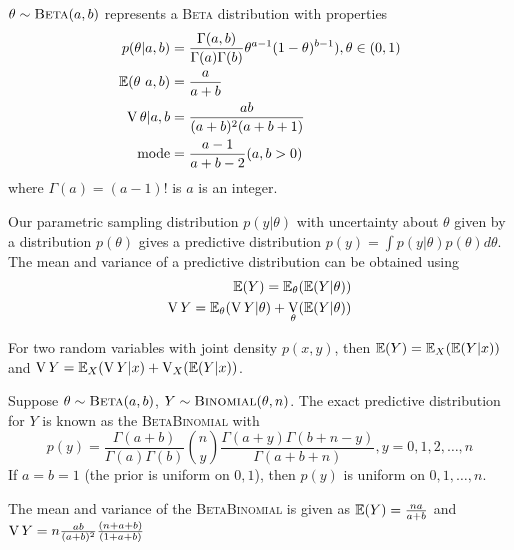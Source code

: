 \begin{defn}
  \label{sec:prob-bayes-theor-4}
  $\theta \sim \textsc{Beta}(a, b)$ represents a \textsc{Beta} distribution with
  properties
  \begin{align}
    p(\theta | a, b) &= \frac{\Gamma(a, b)}{\Gamma(a) \Gamma(b)} \theta^{a-1} (1 - \theta)^{b-1}), \theta \in (0, 1) \\
    \E{\theta \ a, b} &= \frac{a}{a+b} \\
    \V{\theta | a, b} &= \frac{ab}{(a+b)^{2}(a+b+1)} \\
    \text{mode} &= \frac{a-1}{a+b - 2}  (a, b > 0) \\
  \end{align}
  where $\Gamma(a) = (a-1)!$ is $a$ is an integer.
\end{defn}

\begin{thm}
  \label{sec:prob-bayes-theor-5}
  Our parametric sampling distribution $p(y | \theta)$ with
  uncertainty about $\theta$ given by a distribution $p(\theta)$ gives
  a predictive distribution $p(y) = \int p(y| \theta) p(\theta)
  d\theta$.
  The mean and variance of a predictive distribution can be obtained
  using
  \begin{align}
    \label{eq:4}
    \E{Y} = \E_{\theta}(\E{Y | \theta}) \\
    \V{Y} = \E_{\theta}(\V{Y | \theta}) + \V_{\theta}(\E{Y | \theta})
  \end{align}
\end{thm}

\begin{thm}
  \label{sec:prob-bayes-theor-6}
  For two random variables with joint density $p(x, y)$, then $\E{Y} =
  \E_{X}(\E{Y | x})$ and $\V{Y} = \E_{X}(\V{Y | x}) + \V_{X}(\E{Y|x})$.
\end{thm}

\begin{defn}
  \label{sec:prob-bayes-theor-7}
  Suppose $\theta \sim \textsc{Beta}(a, b)$, $Y \sim \textsc{Binomial}(\theta, n)$.  The
  exact predictive distribution for $Y$ is known as the
  \textsc{BetaBinomial} with
  \begin{equation}
    \label{eq:5}
    p(y) = \frac{\Gamma(a+b)}{\Gamma(a) \Gamma(b)}  {n \choose y}
    \frac{\Gamma(a+y) \Gamma(b + n - y)}{\Gamma(a + b + n)}, y = 0,1,2,\dots,n
  \end{equation}
  If $a = b = 1$ (the prior is uniform on $0, 1$), then $p(y)$ is
  uniform on $0, 1, \dots, n$.

  The mean and variance of the \textsc{BetaBinomial} is given as $\E{Y} =
  \frac{na}{a+b}$ and $\operatorname*{V}{Y} = n \frac{ab}{(a+b)^{2}} \frac{(n+a+b)}{(1+a+b)}$
\end{defn}

